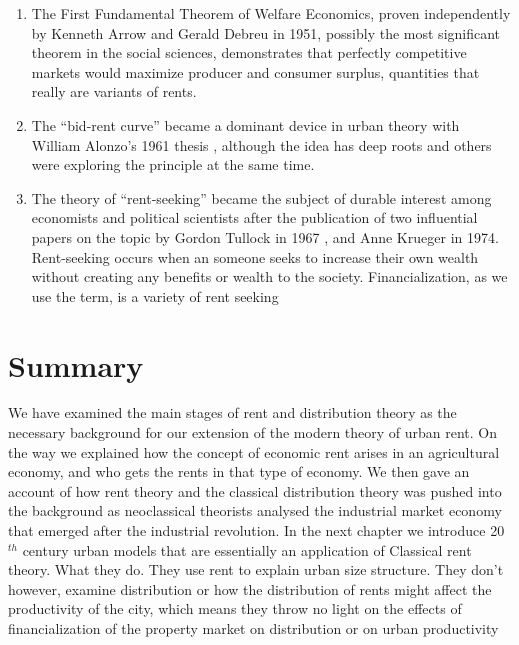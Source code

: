 \begin{enumerate}
    \item The First Fundamental Theorem of Welfare Economics, proven independently by Kenneth Arrow \cite{arrowExtensionBasicTheorems1951}and  Gerald Debreu \cite{debreuCoefficientResourceUtilization1951}  in 1951, possibly the most significant theorem in the social sciences,   demonstrates that perfectly competitive markets would maximize producer and consumer surplus, quantities that really are variants of rents.
    \item The ``\gls{bid-rent curve}'' became a dominant device  in urban theory with William Alonzo's 1961 thesis \cite{alonzoTheoryUrbanLand1960}, although the idea has deep roots and others were exploring the principle at the same time.  
    \item The theory of ``\gls{rent-seeking}''   became the subject of durable interest among economists and political scientists after the publication of two influential papers on the topic by Gordon Tullock in 1967 \cite{tullockWelfareCostsTariffs1967}, and Anne Krueger \cite{kruegerPoliticalEconomyRentSeeking1974} in 1974. Rent-seeking occurs when an someone seeks to increase their own wealth without creating any benefits or wealth to the society. Financialization, as we use the term, is a variety of rent seeking
\end{enumerate}


\section{Summary}
We have examined the main stages of rent and distribution theory 
as the necessary background for our extension of the modern theory of urban rent. On the way we explained how the concept of economic rent arises in an agricultural economy, and who gets the rents in that type of economy. We then gave an account of how rent theory and the classical distribution theory was pushed into the background as neoclassical theorists analysed the industrial market economy that emerged after the industrial revolution. In the next chapter we introduce 20$^{th}$ century urban models that are essentially an application of Classical rent theory.
What they do.
They use rent to explain urban size structure. They don't however, examine distribution or how the distribution of rents might affect the productivity of the city, which means they throw no light on the effects of financialization of the property market on distribution or on urban productivity

